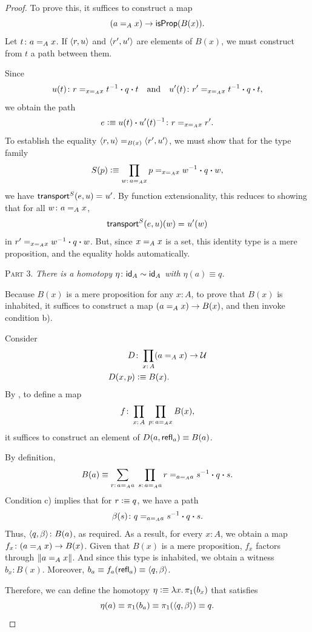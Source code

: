 \begin{proof}
    To prove this, it suffices to construct a map
    \[
        (a\mathrel{=_{A}}x)\to\mathsf{isProp}(B(x)).
    \]
    Let $t\colon a\eq Ax$. If $\langle r,u\rangle$ and $\langle r',u'\rangle$ are elements of $B(x)$, we must construct from $t$ a path between them.

    Since
    \[
    u(t)\colon r\eq{x\eq Ax}t^{-1}\ct q\ct t
    \quad\text{and}\quad
    u'(t)\colon r'\eq{x\eq Ax}t^{-1}\ct q\ct t,
    \]
    we obtain the path
    \[
        e\defeq u(t)\ct u'(t)^{-1}\colon r\eq{x\eq Ax}r'.
    \]
    To establish the equality $\langle r,u\rangle\mathrel{=_{B(x)}}\langle r',u'\rangle$, we must show that for the type family
    \[
        S(p)\defeq\prod_{w\colon a\eq Ax}
            p\eq{x\eq Ax}w^{-1}\ct q\ct w,
    \]
    we have $\mathsf{transport}^S(e,u)\mathrel{=_{}}u'$.
    By function extensionality, this reduces to showing that for all $w\colon a\eq Ax$,
    \[
        \mathsf{transport}^S(e,u)(w)\mathrel{=_{}}u'(w)
    \]
    in $r'\mathrel{=_{x\mathrel{=_{A}}x}}w^{-1}\mathbin{\boldsymbol{\cdot}} q\mathbin{\boldsymbol{\cdot}} w$. But, since $x\mathrel{=_{A}}x$ is a set, this identity type is a mere proposition, and the equality holds automatically.

    \textsc{Part 3.} {\itshape There is a homotopy\/ $\eta\colon\id_A\sim\id_A$ with\/ $\eta(a)\equiv q$.}
    
    Because $B(x)$ is a mere proposition for any $x\colon A$, to prove that $B(x)$ is inhabited, it suffices to construct a map $(a\mathrel{=_{A}}x)\to B(x)$, and then invoke condition b).
    
    Consider
    \begin{align*}
        D&\colon\prod_{x\colon A}(a\eq Ax)\to\univ\\
        D(x,p)&\defeq B(x).
    \end{align*}
    By \textsc{}, to define a map
    \[
        f\colon\prod_{x\colon A}\;\prod_{p\colon a\eq Ax}B(x),
    \]
    it suffices to construct an element of $D(a,\mathsf{refl}_a)\equiv B(a)$.
    
    By definition,
    \[
        B(a)\equiv\sum_{r\colon a\eq Aa}\;\prod_{s\colon a\eq Aa}
            r\eq{a\eq Aa}s^{-1}\ct q\ct s.
    \]
    Condition c) implies that for $r\mathrel{\vcentcolon}\equiv q$, we have a path
    \[
        \beta(s)\colon q\eq{a\eq Aa}s^{-1}\ct q\ct s.
    \]
    Thus, $\dep{q,\beta}\colon B(a)$, as required. As a result, for every $x\colon A$, we obtain a map $f_x\colon(a\eq Ax)\to B(x)$. Given that $B(x)$ is a mere proposition, $f_x$ factors through $\lVert a\mathrel{=_{A}}x\rVert$. And since this type is inhabited, we obtain a witness $b_x\colon B(x)$. Moreover, $b_a\equiv f_a(\mathsf{refl}_a)\equiv\langle q,\beta\rangle$.
    
    Therefore, we can define the homotopy $\eta\mathrel{\vcentcolon}\equiv\lambda x.\,\pi_1(b_x)$ that satisfies
    \[
        \eta(a)
            \equiv\pi_1(b_a)
            \equiv\pi_1(\langle q,\beta\rangle)
            \equiv q.
    \]
\end{proof}

